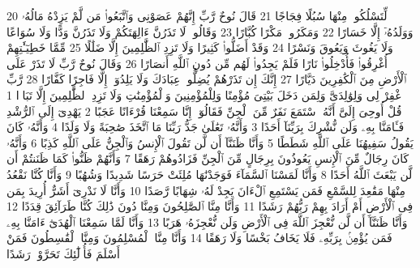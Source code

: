{\tiny\colorbox{cl_aya}{20}} لِّتَسْلُكُوا۟ مِنْهَا سُبُلًا فِجَاجًا
{\tiny\colorbox{cl_aya}{21}} قَالَ نُوحٌ رَّبِّ إِنَّهُمْ عَصَوْنِى وَٱتَّبَعُوا۟ مَن لَّمْ يَزِدْهُ مَالُهُۥ وَوَلَدُهُۥٓ إِلَّا خَسَارًا
{\tiny\colorbox{cl_aya}{22}} وَمَكَرُوا۟ مَكْرًا كُبَّارًا
{\tiny\colorbox{cl_aya}{23}} وَقَالُوا۟ لَا تَذَرُنَّ ءَالِهَتَكُمْ وَلَا تَذَرُنَّ وَدًّا وَلَا سُوَاعًا وَلَا يَغُوثَ وَيَعُوقَ وَنَسْرًا
{\tiny\colorbox{cl_aya}{24}} وَقَدْ أَضَلُّوا۟ كَثِيرًا وَلَا تَزِدِ ٱلظَّٰلِمِينَ إِلَّا ضَلَٰلًا
{\tiny\colorbox{cl_aya}{25}} مِّمَّا خَطِيٓـَٰٔتِهِمْ أُغْرِقُوا۟ فَأُدْخِلُوا۟ نَارًا فَلَمْ يَجِدُوا۟ لَهُم مِّن دُونِ ٱللَّهِ أَنصَارًا
{\tiny\colorbox{cl_aya}{26}} وَقَالَ نُوحٌ رَّبِّ لَا تَذَرْ عَلَى ٱلْأَرْضِ مِنَ ٱلْكَٰفِرِينَ دَيَّارًا
{\tiny\colorbox{cl_aya}{27}} إِنَّكَ إِن تَذَرْهُمْ يُضِلُّوا۟ عِبَادَكَ وَلَا يَلِدُوٓا۟ إِلَّا فَاجِرًا كَفَّارًا
{\tiny\colorbox{cl_aya}{28}} رَّبِّ ٱغْفِرْ لِى وَلِوَٰلِدَىَّ وَلِمَن دَخَلَ بَيْتِىَ مُؤْمِنًا وَلِلْمُؤْمِنِينَ وَٱلْمُؤْمِنَٰتِ وَلَا تَزِدِ ٱلظَّٰلِمِينَ إِلَّا تَبَارًۢا
{\tiny\colorbox{cl_aya}{1}} قُلْ أُوحِىَ إِلَىَّ أَنَّهُ ٱسْتَمَعَ نَفَرٌ مِّنَ ٱلْجِنِّ فَقَالُوٓا۟ إِنَّا سَمِعْنَا قُرْءَانًا عَجَبًا
{\tiny\colorbox{cl_aya}{2}} يَهْدِىٓ إِلَى ٱلرُّشْدِ فَـَٔامَنَّا بِهِۦ وَلَن نُّشْرِكَ بِرَبِّنَآ أَحَدًا
{\tiny\colorbox{cl_aya}{3}} وَأَنَّهُۥ تَعَٰلَىٰ جَدُّ رَبِّنَا مَا ٱتَّخَذَ صَٰحِبَةً وَلَا وَلَدًا
{\tiny\colorbox{cl_aya}{4}} وَأَنَّهُۥ كَانَ يَقُولُ سَفِيهُنَا عَلَى ٱللَّهِ شَطَطًا
{\tiny\colorbox{cl_aya}{5}} وَأَنَّا ظَنَنَّآ أَن لَّن تَقُولَ ٱلْإِنسُ وَٱلْجِنُّ عَلَى ٱللَّهِ كَذِبًا
{\tiny\colorbox{cl_aya}{6}} وَأَنَّهُۥ كَانَ رِجَالٌ مِّنَ ٱلْإِنسِ يَعُوذُونَ بِرِجَالٍ مِّنَ ٱلْجِنِّ فَزَادُوهُمْ رَهَقًا
{\tiny\colorbox{cl_aya}{7}} وَأَنَّهُمْ ظَنُّوا۟ كَمَا ظَنَنتُمْ أَن لَّن يَبْعَثَ ٱللَّهُ أَحَدًا
{\tiny\colorbox{cl_aya}{8}} وَأَنَّا لَمَسْنَا ٱلسَّمَآءَ فَوَجَدْنَٰهَا مُلِئَتْ حَرَسًا شَدِيدًا وَشُهُبًا
{\tiny\colorbox{cl_aya}{9}} وَأَنَّا كُنَّا نَقْعُدُ مِنْهَا مَقَٰعِدَ لِلسَّمْعِ فَمَن يَسْتَمِعِ ٱلْءَانَ يَجِدْ لَهُۥ شِهَابًا رَّصَدًا
{\tiny\colorbox{cl_aya}{10}} وَأَنَّا لَا نَدْرِىٓ أَشَرٌّ أُرِيدَ بِمَن فِى ٱلْأَرْضِ أَمْ أَرَادَ بِهِمْ رَبُّهُمْ رَشَدًا
{\tiny\colorbox{cl_aya}{11}} وَأَنَّا مِنَّا ٱلصَّٰلِحُونَ وَمِنَّا دُونَ ذَٰلِكَ كُنَّا طَرَآئِقَ قِدَدًا
{\tiny\colorbox{cl_aya}{12}} وَأَنَّا ظَنَنَّآ أَن لَّن نُّعْجِزَ ٱللَّهَ فِى ٱلْأَرْضِ وَلَن نُّعْجِزَهُۥ هَرَبًا
{\tiny\colorbox{cl_aya}{13}} وَأَنَّا لَمَّا سَمِعْنَا ٱلْهُدَىٰٓ ءَامَنَّا بِهِۦ فَمَن يُؤْمِنۢ بِرَبِّهِۦ فَلَا يَخَافُ بَخْسًا وَلَا رَهَقًا
{\tiny\colorbox{cl_aya}{14}} وَأَنَّا مِنَّا ٱلْمُسْلِمُونَ وَمِنَّا ٱلْقَٰسِطُونَ فَمَنْ أَسْلَمَ فَأُو۟لَٰٓئِكَ تَحَرَّوْا۟ رَشَدًا
